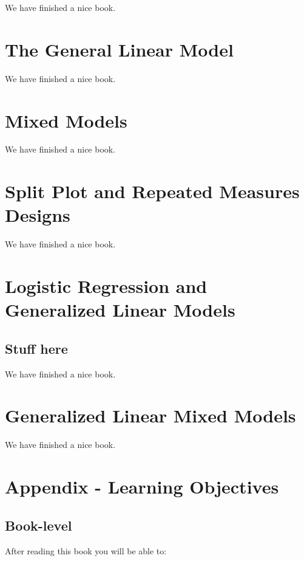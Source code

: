 \documentclass[]{book}
\theoremstyle{definition}
\theoremstyle{definition}
\theoremstyle{definition}
\theoremstyle{remark}
\begin{document}
We have finished a nice book.

\chapter{The General Linear Model}\label{glm}

We have finished a nice book.

\chapter{Mixed Models}\label{mixedmodels}

We have finished a nice book.

\chapter{Split Plot and Repeated Measures
Designs}\label{repeatedmeasures}

We have finished a nice book.

\chapter{Logistic Regression and Generalized Linear
Models}\label{logistic}

\section{Stuff here}\label{stuff-here}

We have finished a nice book.

\chapter{Generalized Linear Mixed Models}\label{glmm}

We have finished a nice book.

\chapter{Appendix - Learning Objectives}\label{learningobj}

\section{Book-level}\label{book-level}

After reading this book you will be able to:
\end{document}
